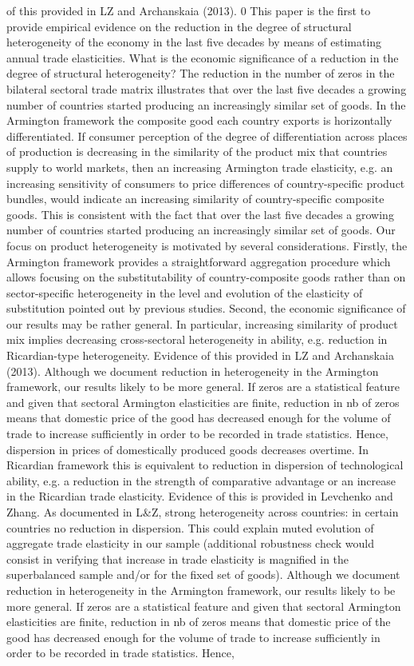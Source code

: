 \documentclass[12pt,twoside,a4paper,notitlepage]{article}
\begin{document}
{of this provided in LZ and Archanskaia (2013). 0 This paper is the first to provide empirical evidence on the reduction in the degree of structural heterogeneity of the economy in the last five decades by means of estimating annual trade elasticities. What is the economic significance of a reduction in the degree of structural heterogeneity? The reduction in the number of zeros in the bilateral sectoral trade matrix illustrates that over the last five decades a growing number of countries started producing an increasingly similar set of goods. In the Armington framework the composite good each country exports is horizontally differentiated. If consumer perception of the degree of differentiation across places of production is decreasing in the similarity of the product mix that countries supply to world markets, then an increasing Armington trade elasticity, e.g. an increasing sensitivity of consumers to price differences of country-specific product bundles, would indicate an increasing similarity of country-specific composite goods. This is consistent with the fact that over the last five decades a growing number of countries started producing an increasingly similar set of goods. Our focus on product heterogeneity is motivated by several considerations. Firstly, the Armington framework provides a straightforward aggregation procedure which allows focusing on the substitutability of country-composite goods rather than on sector-specific heterogeneity in the level and evolution of the elasticity of substitution pointed out by previous studies. Second, the economic significance of our results may be rather general. In particular, increasing similarity of product mix implies decreasing cross-sectoral heterogeneity in ability, e.g. reduction in Ricardian-type heterogeneity. Evidence of this provided in LZ and Archanskaia (2013). Although we document reduction in heterogeneity in the Armington framework, our results likely to be more general. If zeros are a statistical feature and given that sectoral Armington elasticities are finite, reduction in nb of zeros means that domestic price of the good has decreased enough for the volume of trade to increase sufficiently in order to be recorded in trade statistics. Hence, dispersion in prices of domestically produced goods decreases overtime. In Ricardian framework this is equivalent to reduction in dispersion of technological ability, e.g. a reduction in the strength of comparative advantage or an increase in the Ricardian trade elasticity. Evidence of this is provided in Levchenko and Zhang. As documented in L\&Z, strong heterogeneity across countries: in certain countries no reduction in dispersion. This could explain muted evolution of aggregate trade elasticity in our sample (additional robustness check would consist in verifying that increase in trade elasticity is magnified in the superbalanced sample and/or for the fixed set of goods). Although we document reduction in heterogeneity in the Armington framework, our results likely to be more general. If zeros are a statistical feature and given that sectoral Armington elasticities are finite, reduction in nb of zeros means that domestic price of the good has decreased enough for the volume of trade to increase sufficiently in order to be recorded in trade statistics. Hence, }
\end{document}

